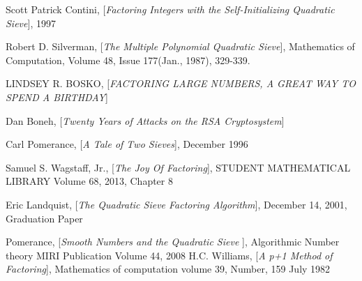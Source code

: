 \documentclass[12pt]{article} %
\begin{document}
\pagebreak
\begin{thebibliography}{99}

 Scott Patrick Contini, [\textit{Factoring Integers with the Self-Initializing Quadratic Sieve}], 1997

 Robert D. Silverman, [\textit{The Multiple Polynomial Quadratic Sieve}], Mathematics of Computation, Volume 48, Issue 177(Jan., 1987), 329-339.

 LINDSEY R. BOSKO, [\textit{FACTORING LARGE NUMBERS, A GREAT WAY TO SPEND A BIRTHDAY}]

 Dan Boneh, [\textit{Twenty Years of Attacks on the RSA Cryptosystem}]

 Carl Pomerance, [\textit{A Tale of Two Sieves}], December 1996

 Samuel S. Wagstaff, Jr., [\textit{The Joy Of Factoring}], STUDENT MATHEMATICAL LIBRARY Volume 68, 2013, Chapter 8

 Eric Landquist, [\textit{The Quadratic Sieve Factoring Algorithm}], December 14, 2001, Graduation Paper

 Pomerance, [\textit{Smooth Numbers and the Quadratic Sieve }], Algorithmic Number theory MIRI Publication Volume 44, 2008
 H.C. Williams, [\textit{A p+1 Method of Factoring}], Mathematics of computation volume 39, Number, 159 July 1982

\end{thebibliography}

 
\end{document}
